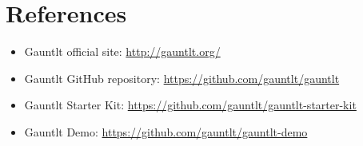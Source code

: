 \documentclass[11pt]{article}
\begin{document}
\section*{References}
\begin{itemize}
  \item Gauntlt official site: \url{http://gauntlt.org/}
  \item Gauntlt GitHub repository: \url{https://github.com/gauntlt/gauntlt}
  \item Gauntlt Starter Kit: \url{https://github.com/gauntlt/gauntlt-starter-kit}
  \item Gauntlt Demo: \url{https://github.com/gauntlt/gauntlt-demo}
\end{itemize}
\end{document}
